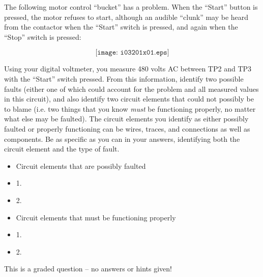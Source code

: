 

The following motor control ``bucket'' has a problem.  When the ``Start'' button is pressed, the motor refuses to start, although an audible ``clunk'' may be heard from the contactor when the ``Start'' switch is pressed, and again when the ``Stop'' switch is pressed:

$$\texttt{[image: i03201x01.eps]}$$

Using your digital voltmeter, you measure 480 volts AC between TP2 and TP3 with the ``Start'' switch pressed.  From this information, identify two possible faults (either one of which could account for the problem and all measured values in this circuit), and also identify two circuit elements that could not possibly be to blame (i.e. two things that you know {\it must} be functioning properly, no matter what else may be faulted).  The circuit elements you identify as either possibly faulted or properly functioning can be wires, traces, and connections as well as components.  Be as specific as you can in your answers, identifying both the circuit element and the type of fault.

\begin{itemize}
\goodbreak
\item{} Circuit elements that are possibly faulted
\item{1.}
\item{2.} 
\end{itemize}

\begin{itemize}
\goodbreak
\item{} Circuit elements that must be functioning properly
\item{1.} 
\item{2.} 
\end{itemize}

\vfil 

\eject






This is a graded question -- no answers or hints given!






